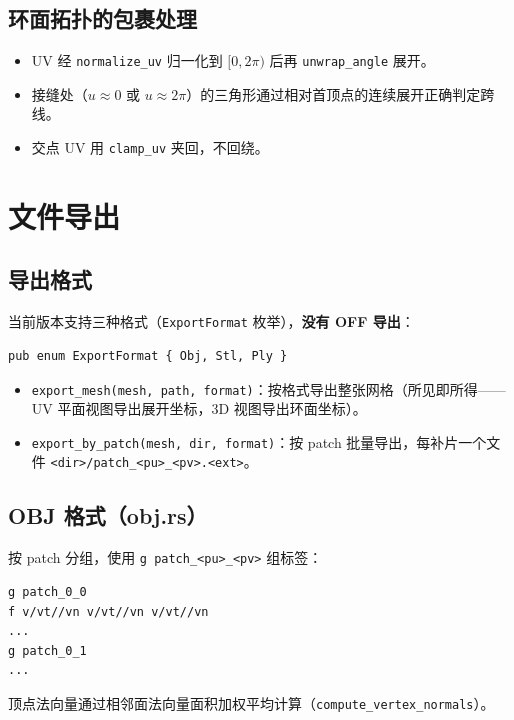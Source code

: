\documentclass[12pt,a4paper]{article}
\begin{document}
\subsection{环面拓扑的包裹处理}

\begin{itemize}
\item UV 经 \texttt{normalize\_uv} 归一化到 $[0,2\pi)$ 后再 \texttt{unwrap\_angle} 展开。
\item 接缝处（$u\approx 0$ 或 $u\approx 2\pi$）的三角形通过相对首顶点的连续展开正确判定跨线。
\item 交点 UV 用 \texttt{clamp\_uv} 夹回，不回绕。
\end{itemize}

\section{文件导出}

\subsection{导出格式}

当前版本支持三种格式（\texttt{ExportFormat} 枚举），\textbf{没有 OFF 导出}：

\begin{lstlisting}[]
pub enum ExportFormat { Obj, Stl, Ply }
\end{lstlisting}

\begin{itemize}
\item \texttt{export\_mesh(mesh, path, format)}：按格式导出整张网格（所见即所得——UV 平面视图导出展开坐标，3D 视图导出环面坐标）。
\item \texttt{export\_by\_patch(mesh, dir, format)}：按 patch 批量导出，每补片一个文件
  \texttt{<dir>/patch\_<pu>\_<pv>.<ext>}。
\end{itemize}

\subsection{OBJ 格式（obj.rs）}

按 patch 分组，使用 \texttt{g patch\_<pu>\_<pv>} 组标签：
\begin{verbatim}
g patch_0_0
f v/vt//vn v/vt//vn v/vt//vn
...
g patch_0_1
...
\end{verbatim}
顶点法向量通过相邻面法向量面积加权平均计算（\texttt{compute\_vertex\_normals}）。
\end{document}
